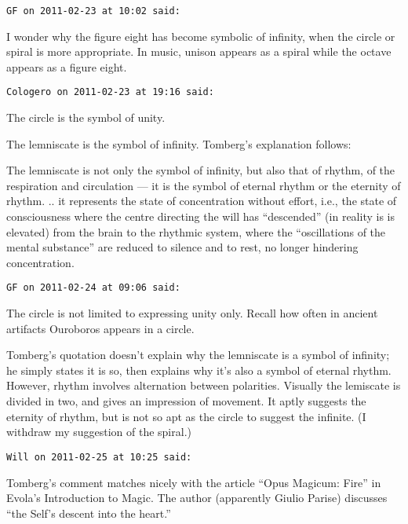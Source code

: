 \begin{footnotesize}\begin{sffamily}


\hfill

\texttt{GF on 2011-02-23 at 10:02 said: }

I wonder why the figure eight has become symbolic of infinity, when the circle or spiral is more appropriate. In music, unison appears as a spiral while the octave appears as a figure eight.


\hfill

\texttt{Cologero on 2011-02-23 at 19:16 said: }

The circle is the symbol of unity.

The lemniscate is the symbol of infinity. Tomberg's explanation follows:

\begin{quotex}
The lemniscate is not only the symbol of infinity, but also that of rhythm, of the respiration and circulation — it is the symbol of eternal rhythm or the eternity of rhythm. .. it represents the state of concentration without effort, i.e., the state of consciousness where the centre directing the will has “descended” (in reality is is elevated) from the brain to the rhythmic system, where the “oscillations of the mental substance” are reduced to silence and to rest, no longer hindering concentration. 

\end{quotex}

\hfill

\texttt{GF on 2011-02-24 at 09:06 said: }

The circle is not limited to expressing unity only. Recall how often in ancient artifacts Ouroboros appears in a circle.

Tomberg's quotation doesn't explain why the lemniscate is a symbol of infinity; he simply states it is so, then explains why it's also a symbol of eternal rhythm. However, rhythm involves alternation between polarities. Visually the lemiscate is divided in two, and gives an impression of movement. It aptly suggests the eternity of rhythm, but is not so apt as the circle to suggest the infinite. (I withdraw my suggestion of the spiral.)


\hfill

\texttt{Will on 2011-02-25 at 10:25 said: }

Tomberg's comment matches nicely with the article “Opus Magicum: Fire” in Evola's Introduction to Magic. The author (apparently Giulio Parise) discusses “the Self's descent into the heart.”


\end{sffamily}\end{footnotesize}
